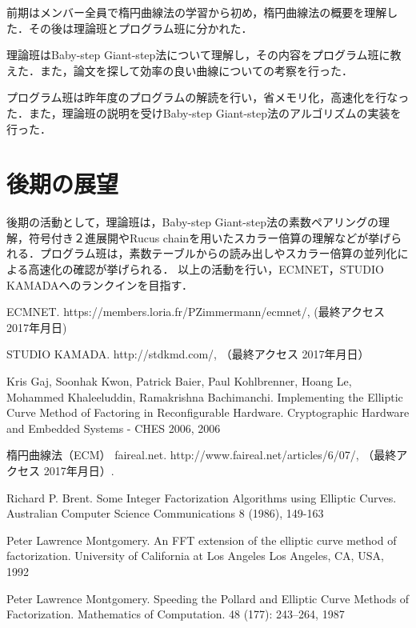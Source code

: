 \documentclass[openany,11pt,papersize]{jsbook}
\begin{document}
前期はメンバー全員で楕円曲線法の学習から初め，楕円曲線法の概要を理解した．その後は理論班とプログラム班に分かれた．\par
理論班はBaby-step Giant-step法について理解し，その内容をプログラム班に教えた．また，論文を探して効率の良い曲線についての考察を行った．\par
プログラム班は昨年度のプログラムの解読を行い，省メモリ化，高速化を行なった．また，理論班の説明を受けBaby-step Giant-step法のアルゴリズムの実装を行った．\par


\section{後期の展望}

後期の活動として，理論班は，Baby-step Giant-step法の素数ペアリングの理解，符号付き２進展開やRucus chainを用いたスカラー倍算の理解などが挙げられる．プログラム班は，素数テーブルからの読み出しやスカラー倍算の並列化による高速化の確認が挙げられる．
以上の活動を行い，ECMNET，STUDIO KAMADAへのランクインを目指す．



\begin{appendix}
\end{appendix}



\begin{thebibliography}{9}

\newblock ECMNET.
\newblock https://members.loria.fr/PZimmermann/ecmnet/, (最終アクセス 2017年月日)

\newblock STUDIO KAMADA. 
\newblock http://stdkmd.com/, （最終アクセス 2017年月日）

\newblock Kris Gaj, Soonhak Kwon, Patrick Baier, Paul Kohlbrenner, Hoang Le, Mohammed Khaleeluddin, Ramakrishna Bachimanchi.
\newblock Implementing the Elliptic Curve Method of Factoring in Reconfigurable Hardware.
\newblock Cryptographic Hardware and Embedded Systems - CHES 2006, 2006

\newblock 楕円曲線法（ECM） faireal.net.
\newblock http://www.faireal.net/articles/6/07/, （最終アクセス 2017年月日）.

\newblock Richard P. Brent.
\newblock Some Integer Factorization Algorithms using Elliptic Curves.
\newblock Australian Computer Science Communications 8 (1986), 149-163

\newblock Peter Lawrence Montgomery.
\newblock An FFT extension of the elliptic curve method of factorization.
\newblock University of California at Los Angeles Los Angeles, CA, USA, 1992

\newblock Peter Lawrence Montgomery.
\newblock Speeding the Pollard and Elliptic Curve Methods of Factorization.
\newblock Mathematics of Computation. 48 (177): 243–264, 1987






\end{thebibliography}
\end{document}
